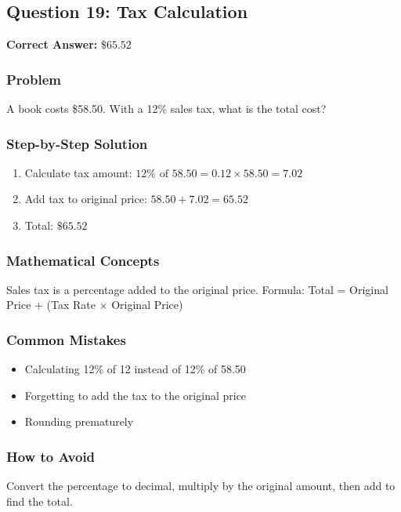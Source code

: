 \documentclass[12pt,a4paper]{article}
\begin{document}
\vspace{0.5cm}

\subsection*{Question 19: Tax Calculation}

\textbf{Correct Answer:} $\$65.52$

\subsubsection*{Problem}
A book costs \$58.50. With a 12\% sales tax, what is the total cost?

\subsubsection*{Step-by-Step Solution}
\begin{enumerate}
    \item Calculate tax amount: $12\% \text{ of } 58.50 = 0.12 \times 58.50 = 7.02$
    \item Add tax to original price: $58.50 + 7.02 = 65.52$
    \item Total: $\$65.52$
\end{enumerate}

\subsubsection*{Mathematical Concepts}
Sales tax is a percentage added to the original price. Formula: Total = Original Price + (Tax Rate $\times$ Original Price)

\subsubsection*{Common Mistakes}
\begin{itemize}
    \item Calculating 12\% of 12 instead of 12\% of 58.50
    \item Forgetting to add the tax to the original price
    \item Rounding prematurely
\end{itemize}

\subsubsection*{How to Avoid}
Convert the percentage to decimal, multiply by the original amount, then add to find the total.
\end{document}

